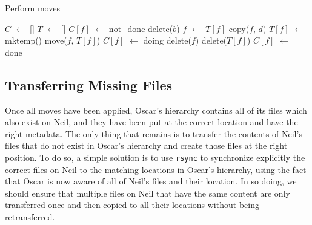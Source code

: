 \documentclass{llncs}
\newcommand*\Let[2]{\State #1 $\gets$ #2}
\newcommand{\rsync}{\texttt{rsync}\xspace}
\begin{document}
\begin{algorithm}
  \caption{Perform moves}
  \label{alg:moves}
  \begin{algorithmic}[1]
    \Statex
    \Let{$C$}{[]} 
    \Let{$T$}{[]} 
      \Let{$C[f]$}{not\_done}
    \EndFor
          \State delete($b$) 
        \Else
          \State {} 
        \EndIf
      \EndIf
        \Let{$f$}{$T[f]$}
      \EndIf
      \State copy($f$, $d$)
    \EndFunction
        \State \Return {}
      \EndIf
          \Let{$T[f]$}{mktemp()}
          \State move($f$, $T[f]$)
        \EndIf
        \State \Return {}
      \EndIf
      \Let{$C[f]$}{doing}
          \State {} 
        \EndIf
      \EndFor
        \State delete($f$)
      \EndIf
        \State delete($T[f]$)
      \EndIf
      \Let{$C[f]$}{done}
    \EndFunction

      \State {}
    \EndFor
  \end{algorithmic}
\end{algorithm}

\subsection{Transferring Missing Files}
\label{sec:transferring}

Once all moves have been applied, Oscar's hierarchy contains all of its files
which also exist on Neil, and they have been put at the correct location and have the right metadata. The
only thing that remains is to transfer the contents of Neil's files that do not
exist in Oscar's hierarchy and create those files at the right position. To do
so, a simple solution is to use \rsync to synchronize explicitly the correct
files on Neil to the matching locations in Oscar's hierarchy, using the fact that
Oscar is now aware of all of Neil's files and their location. In so doing, we should ensure that multiple files on Neil that have the same content are only transferred once and then copied to all their locations without being retransferred.
\end{document}
